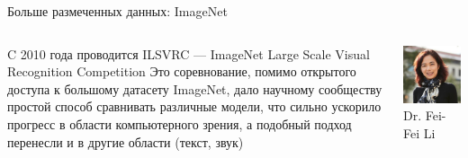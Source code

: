 \documentclass[aspectratio=169, professionalfonts]{beamer}
\begin{document}
\begin{frame}{Больше размеченных данных: ImageNet}
    \begin{columns}[T]
        \begin{column}{.6\linewidth}
            \begin{outline}
                \1 C 2010 года проводится ILSVRC --- ImageNet Large Scale Visual
                Recognition Competition
                \1 Это соревнование, помимо открытого доступа к большому датасету
                ImageNet, дало научному сообществу простой способ сравнивать
                различные модели, что сильно ускорило прогресс в области компьютерного зрения,
                а подобный подход перенесли и в другие области (текст, звук)
            \end{outline}
        \end{column}
        \begin{column}{.39\linewidth}
            \centering
            \includegraphics[width=\linewidth]{figures/fig51-fei-fei-li.jpg} \\
            Dr. Fei-Fei Li
        \end{column}
    \end{columns}
\end{frame}
\end{document}
